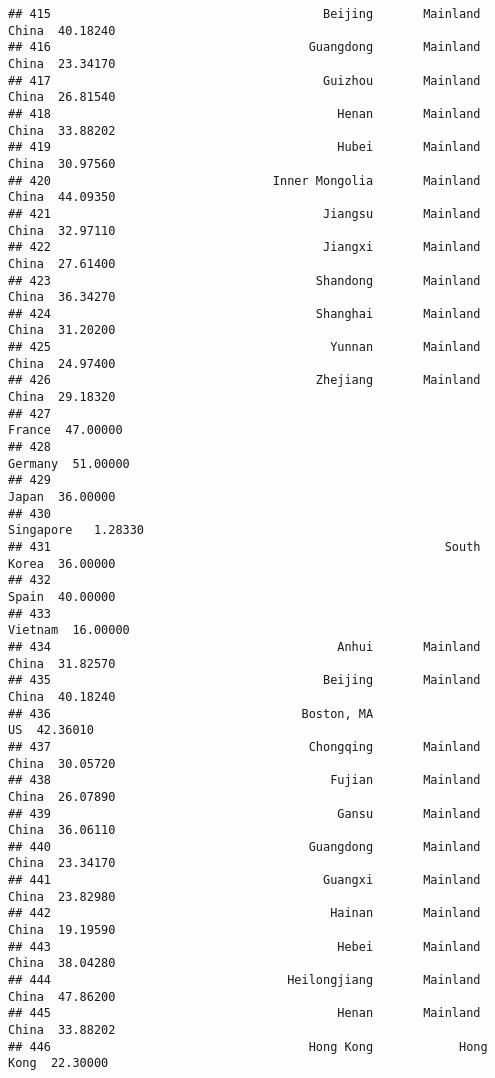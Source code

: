 \documentclass[
]{article}
\begin{document}
\begin{verbatim}
## 415                                      Beijing       Mainland China  40.18240
## 416                                    Guangdong       Mainland China  23.34170
## 417                                      Guizhou       Mainland China  26.81540
## 418                                        Henan       Mainland China  33.88202
## 419                                        Hubei       Mainland China  30.97560
## 420                               Inner Mongolia       Mainland China  44.09350
## 421                                      Jiangsu       Mainland China  32.97110
## 422                                      Jiangxi       Mainland China  27.61400
## 423                                     Shandong       Mainland China  36.34270
## 424                                     Shanghai       Mainland China  31.20200
## 425                                       Yunnan       Mainland China  24.97400
## 426                                     Zhejiang       Mainland China  29.18320
## 427                                                            France  47.00000
## 428                                                           Germany  51.00000
## 429                                                             Japan  36.00000
## 430                                                         Singapore   1.28330
## 431                                                       South Korea  36.00000
## 432                                                             Spain  40.00000
## 433                                                           Vietnam  16.00000
## 434                                        Anhui       Mainland China  31.82570
## 435                                      Beijing       Mainland China  40.18240
## 436                                   Boston, MA                   US  42.36010
## 437                                    Chongqing       Mainland China  30.05720
## 438                                       Fujian       Mainland China  26.07890
## 439                                        Gansu       Mainland China  36.06110
## 440                                    Guangdong       Mainland China  23.34170
## 441                                      Guangxi       Mainland China  23.82980
## 442                                       Hainan       Mainland China  19.19590
## 443                                        Hebei       Mainland China  38.04280
## 444                                 Heilongjiang       Mainland China  47.86200
## 445                                        Henan       Mainland China  33.88202
## 446                                    Hong Kong            Hong Kong  22.30000

\end{verbatim}
\end{document}
